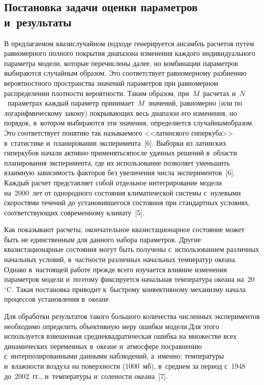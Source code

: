 \begin{multicols}{2}
  
\section{Постановка задачи оценки параметров и~результаты}

  
  В предлагаемом квазислучайном подходе генерируется ансамбль расчетов 
путем равномерного полного покрытия диапазона изменения каждого 
индивидуального параметра модели, которые перечислены далее, но 
комбинации параметров выбираются случайным образом. Это соответствует 
равномерному разбиению вероятностного пространства значений параметров 
при равномерном распределении плотности вероятности. Таким образом,\linebreak 
при~$M$~расчетах и~$N$~параметрах каждый параметр 
принимает~$M$~значений, равномерно (или по логарифмическому закону) 
покрывающих весь диа\-пазон его изменения, но порядок, в~котором выбираются 
эти значения, определяется случайным\linebreak образом. Это соответствует понятию так 
называ\-емого <<латинского гиперкуба>> в~статистике и~планировании 
эксперимента~[6]. Выборки из латинских гиперкубов начали активно 
применяться\linebreak после удачных решений в~области планирования эксперимента, 
где их использование позволяет уменьшить взаимную зависимость факторов 
без увеличения числа экспериментов~[6]. Каждый расчет представляет собой 
отдельное интегрирование модели на~2000~лет от однородного состояния 
климатической системы с~нулевыми скоростями течений до установившегося 
состояния при стандартных условиях, соответствующих современному 
климату~[5]. 

Как показывают расчеты, окончательное квазистационарное 
состояние может быть не единственным для данного набора параметров. 
Другие квазистационарные состояния могут быть получены с~использованием 
различных начальных условий, в~частности различных начальных температур 
океана. Однако в~настоящей работе прежде всего изучается влияние изменения 
параметров модели и~поэтому фиксируется начальная температура океана 
на~20~$^\circ$C. Такая постановка приводит к~быстрому конвективному 
механизму начала процессов установления в~океане. 

Для обработки результатов 
такого большого количества численных экспериментов необходимо определить 
объективную меру ошибки модели.\linebreak Для этого используется взвешенная 
сред\-не\-квад\-ратическая ошибка на множестве всех динамических переменных 
в~океане и~атмосфере по\linebreak сравнению с~интерполированными данными 
наблюдений, а~именно: температуры и~влажности воздуха на поверхности 
(1000~мб), в~среднем за период с~1948 до~2002~гг., и~температуры и~солености 
океана~[7].
  

\end{multicols}

